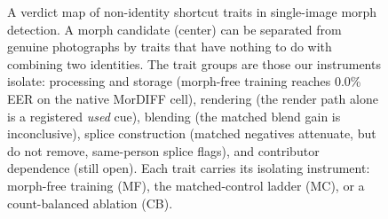 \documentclass[10pt,twocolumn,letterpaper]{article}
\begin{document}



\begin{figure}[tbp]
\centering

\caption{A verdict map of non-identity shortcut traits in single-image morph detection. A morph candidate (center) can be separated from genuine photographs by traits that have nothing to do with combining two identities. The trait groups are those our instruments isolate: processing and storage (morph-free training reaches 0.0\% EER on the native MorDIFF cell), rendering (the render path alone is a registered \emph{used} cue), blending (the matched blend gain is inconclusive), splice construction (matched negatives attenuate, but do not remove, same-person splice flags), and contributor dependence (still open). Each trait carries its isolating instrument: morph-free training (MF), the matched-control ladder (MC), or a count-balanced ablation (CB).}
\label{fig:shortcuts_overview}
\end{figure}


\end{document}
